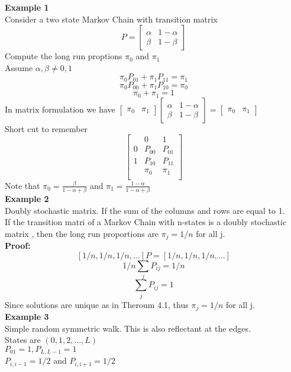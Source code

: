 \documentclass{article}
\begin{document}
\textbf{Example 1}\\
Consider a two state Markov Chain with transition matrix 
$$ P = \begin{bmatrix}
    \alpha & 1 - \alpha \\
    \beta & 1-\beta
\end{bmatrix}$$
Compute the long run proptions $\pi_0$ and $\pi_1$\\
Assume $\alpha , \beta \neq 0,1$\\
$$\pi_0 P_{01} + \pi_1 P_{11} = \pi_1$$
$$\pi_0 P_{00} + \pi_1 P_{10} = \pi_0$$
$$\pi_0 + \pi_1 = 1$$
In matrix formulation we have $\begin{bmatrix}
    \pi_0 & \pi_1
\end{bmatrix} \begin{bmatrix}
    \alpha & 1 - \alpha \\
    \beta & 1-\beta
\end{bmatrix} = \begin{bmatrix}
    \pi_0 & \pi_1
\end{bmatrix}$\\
Short cut to remember 
$$ \begin{bmatrix}
    & 0 & 1 \\
    0 & P_{00} & P_{01}\\
    1 & P_{10} & P_{11}\\
    & \pi_0 & \pi_1 \\
\end{bmatrix}
$$
Note that $\pi_0 = \frac{\beta}{1- \alpha + \beta}$ and $\pi_1 = \frac{1-\alpha}{1 - \alpha + \beta}$\\
\textbf{Example 2}\\
Doubly stochastic matrix. If the sum of the columns and rows are equal to 1.\\
If the transition matri of a Markov Chain with n-states is a doubly stochastic matrix , then the long run proportions are $\pi_j = 1/n$ for all j.\\
\textbf{Proof:}
$$[1/n, 1/n, 1/n, \dots] P = [1/n, 1/n, 1/n, \dots]$$
$$ 1/n \sum_{j} P_{ij} = 1/n$$
$$\sum_{j} P_{ij} = 1$$
Since solutions are unique as in Theroum 4.1, thus $\pi_j = 1/n$ for all j.\\
\textbf{Example 3}\\
Simple random symmetric walk. This is also reflectant at the edges.\\
States are $(0, 1, 2, \dots, L)$\\
$P_{01} = 1, P_{L,L-1} = 1$\\
$P_{i,i-1} = 1/2$ and $P_{i,i+1} = 1/2$\\
\end{document}
